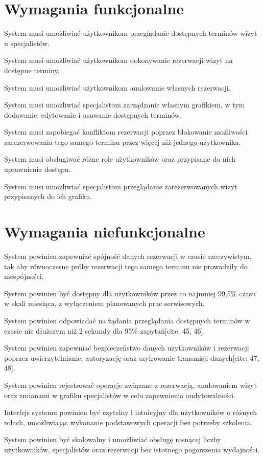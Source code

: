 \documentclass[12pt,a4paper]{article}
\begin{document}
\section{Wymagania funkcjonalne}
\begin{description}[leftmargin=1.8cm, labelwidth=1.3cm, labelsep=0.5cm]
    \item[FR1] System musi umożliwiać użytkownikom przeglądanie dostępnych terminów wizyt u specjalistów.
    \item[FR2] System musi umożliwiać użytkownikom dokonywanie rezerwacji wizyt na dostępne terminy.
    \item[FR3] System musi umożliwiać użytkownikom anulowanie własnych rezerwacji.
    \item[FR4] System musi umożliwiać specjalistom zarządzanie własnym grafikiem, w tym dodawanie, edytowanie i usuwanie dostępnych terminów.
    \item[FR5] System musi zapobiegać konfliktom rezerwacji poprzez blokowanie możliwości zarezerwowania tego samego terminu przez więcej niż jednego użytkownika.
    \item[FR6] System musi obsługiwać różne role użytkowników oraz przypisane do nich uprawnienia dostępu.
    \item[FR7] System musi umożliwiać specjalistom przeglądanie zarezerwowanych wizyt przypisanych do ich grafiku.
\end{description}

\section{Wymagania niefunkcjonalne}
\begin{description}[leftmargin=1.8cm, labelwidth=1.3cm, labelsep=0.5cm]
    \item[NFR1] System powinien zapewniać spójność danych rezerwacji w czasie rzeczywistym, tak aby równoczesne próby rezerwacji tego samego terminu nie prowadziły do niespójności.
    \item[NFR2] System powinien być dostępny dla użytkowników przez co najmniej 99,5\% czasu w skali miesiąca, z wyłączeniem planowanych prac serwisowych.
    \item[NFR3] System powinien odpowiadać na żądania przeglądania dostępnych terminów w czasie nie dłuższym niż 2 sekundy dla 95\% zapytań[cite: 45, 46].
    \item[NFR4] System powinien zapewniać bezpieczeństwo danych użytkowników i rezerwacji poprzez uwierzytelnianie, autoryzację oraz szyfrowanie transmisji danych[cite: 47, 48].
    \item[NFR5] System powinien rejestrować operacje związane z rezerwacją, anulowaniem wizyt oraz zmianami w grafiku specjalistów w celu zapewnienia audytowalności.
    \item[NFR6] Interfejs systemu powinien być czytelny i intuicyjny dla użytkowników o różnych rolach, umożliwiając wykonanie podstawowych operacji bez potrzeby szkolenia.
    \item[NFR7] System powinien być skalowalny i umożliwiać obsługę rosnącej liczby użytkowników, specjalistów oraz rezerwacji bez istotnego pogorszenia wydajności.
\end{description}
\end{document}
